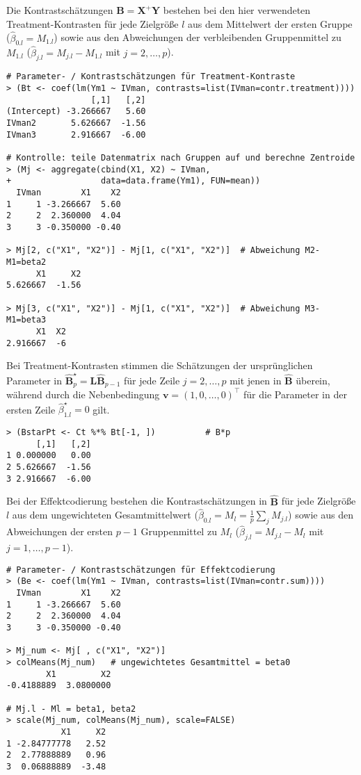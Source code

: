 Die Kontrastschätzungen $\hat{\bm{B}} = \bm{X}^{+} \bm{Y}$ bestehen bei den hier verwendeten Treatment-Kontrasten für jede Zielgröße $l$ aus dem Mittelwert der ersten Gruppe ($\hat{\beta}_{0.l} = M_{1.l}$) sowie aus den Abweichungen der verbleibenden Gruppenmittel zu $M_{1.l}$ ($\hat{\beta}_{j.l} = M_{j.l} - M_{1.l}$ mit $j = 2, \ldots, p$).
\begin{lstlisting}
# Parameter- / Kontrastschätzungen für Treatment-Kontraste
> (Bt <- coef(lm(Ym1 ~ IVman, contrasts=list(IVman=contr.treatment))))
                 [,1]   [,2]
(Intercept) -3.266667   5.60
IVman2       5.626667  -1.56
IVman3       2.916667  -6.00

# Kontrolle: teile Datenmatrix nach Gruppen auf und berechne Zentroide
> (Mj <- aggregate(cbind(X1, X2) ~ IVman,
+                  data=data.frame(Ym1), FUN=mean))
  IVman        X1    X2
1     1 -3.266667  5.60
2     2  2.360000  4.04
3     3 -0.350000 -0.40

> Mj[2, c("X1", "X2")] - Mj[1, c("X1", "X2")]  # Abweichung M2-M1=beta2
      X1     X2
5.626667  -1.56

> Mj[3, c("X1", "X2")] - Mj[1, c("X1", "X2")]  # Abweichung M3-M1=beta3
      X1  X2
2.916667  -6
\end{lstlisting}

Bei Treatment-Kontrasten stimmen die Schätzungen der ursprünglichen Parameter in $\hat{\bm{B}}_{p}^{\star} = \bm{L} \hat{\bm{B}}_{p-1}$ für jede Zeile $j = 2, \ldots, p$ mit jenen in $\hat{\bm{B}}$ überein, während durch die Nebenbedingung $\bm{v} = (1, 0, \ldots, 0)^{\top}$ für die Parameter in der ersten Zeile $\hat{\beta}_{1.l}^{\star} = 0$ gilt.
\begin{lstlisting}
> (BstarPt <- Ct %*% Bt[-1, ])          # B*p
      [,1]   [,2]
1 0.000000   0.00
2 5.626667  -1.56
3 2.916667  -6.00
\end{lstlisting}

Bei der Effektcodierung bestehen die Kontrastschätzungen in $\hat{\bm{B}}$ für jede Zielgröße $l$ aus dem ungewichteten Gesamtmittelwert ($\hat{\beta}_{0.l} = M_{l} = \frac{1}{p} \sum_{j} M_{j.l}$) sowie aus den Abweichungen der ersten $p-1$ Gruppenmittel zu $M_{l}$ ($\hat{\beta}_{j.l} = M_{j.l} - M_{l}$ mit $j = 1, \ldots, p-1$).
\begin{lstlisting}
# Parameter- / Kontrastschätzungen für Effektcodierung
> (Be <- coef(lm(Ym1 ~ IVman, contrasts=list(IVman=contr.sum))))
  IVman        X1    X2
1     1 -3.266667  5.60
2     2  2.360000  4.04
3     3 -0.350000 -0.40

> Mj_num <- Mj[ , c("X1", "X2")]
> colMeans(Mj_num)   # ungewichtetes Gesamtmittel = beta0
        X1         X2
-0.4188889  3.0800000

# Mj.l - Ml = beta1, beta2
> scale(Mj_num, colMeans(Mj_num), scale=FALSE)
           X1     X2
1 -2.84777778   2.52
2  2.77888889   0.96
3  0.06888889  -3.48
\end{lstlisting}

